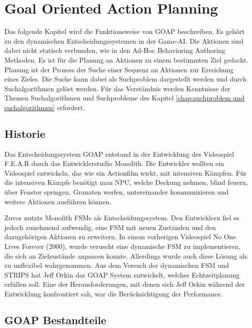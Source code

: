 \chapter{Goal Oriented Action Planning}
\label{chap:goap}

Das folgende Kapitel wird die Funktionsweise von GOAP beschreiben. Es geh\"{o}rt zu den dynamischen Entscheidungssystemen in der Game-AI. Die Aktionen sind dabei nicht statisch verbunden, wie in den Ad-Hoc Behavioring Authoring Methoden. Es ist f\"{u}r die Planung an Aktionen zu einem bestimmten Ziel gedacht. Planung ist der Prozess der Suche einer Sequenz an Aktionen zur Erreichung eines Zieles. Die Suche kann dabei als Suchproblem dargestellt werden und durch Suchalgorithmen gel\"{o}st werden. F\"{u}r das Verst\"{a}ndnis werden Kenntnisse der Themen Suchalgorithmen und Suchprobleme des Kapitel \ref{chap:suchproblem und suchalgorithmen} erfordert.

\section{Historie}
\label{chap:goap historie}

Das Entscheidungssystem GOAP entstand in der Entwicklung des Videospiel F.E.A.R durch das Entwicklerstudio Monolith. Die Entwickler wollten ein Videospiel entwickeln, das wie ein Actionfilm wirkt, mit intensiven K\"{a}mpfen. F\"{u}r die intensiven K\"{a}mpfe ben\"{o}tigt man NPC, welche Deckung nehmen, blind feuern, \"{u}ber Fenster springen, Granaten werfen, untereinander kommunizieren und weitere Aktionen ausf\"{u}hren k\"{o}nnen.\autocite{fear}

Zuvor nutzte Monolith FSMs als Entscheidungssystem. Den Entwicklern fiel es jedoch zunehmend aufwendig, eine FSM mit neuen Zust\"{a}nden und den dazugeh\"{o}rigen Aktionen zu erweitern. In einem vorherigen Videospiel No One Lives Forever (2000), wurde veruscht eine dynamische FSM zu implementieren, die sich an Zielzust\"{a}nde anpassen konnte. Allerdings wurde auch diese L\"{o}sung als zu unflexibel wahrgenommen. Aus dem Versuch der dynamischen FSM und STRIPS hat Jeff Orkin das GOAP System entwickelt, welches Echtzeitplanung erf\"{u}llen soll. Eine der Herausforderungen, mit denen sich Jeff Orkin w\"{a}hrend der Entwicklung konfrontiert sah, war die Ber\"{u}cksichtigung der Performance.\autocite{retro_fear}



\section{GOAP Bestandteile}
\label{chap:goap bestandteile}

